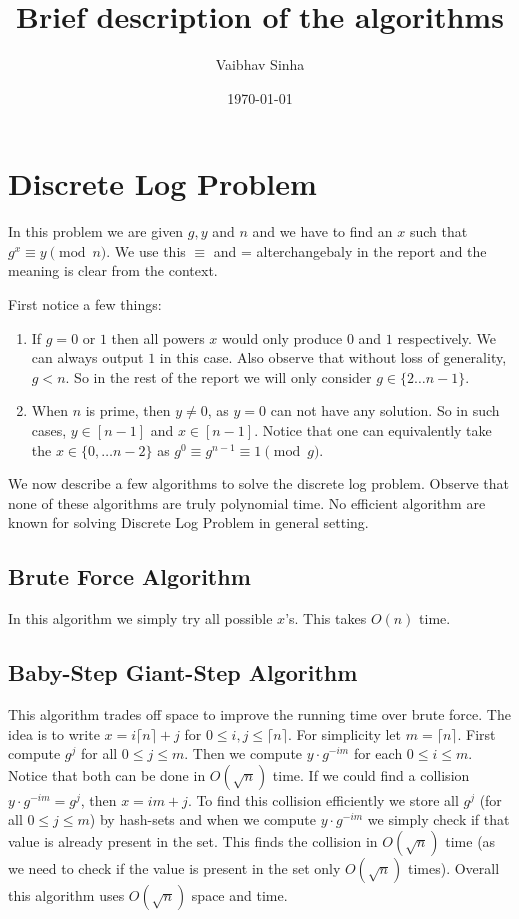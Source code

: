 \documentclass[letterpaper,12pt]{article}
\theoremstyle{remark}
\begin{document}
\title{Brief description of the algorithms}
\date{\today}
\author{Vaibhav Sinha}
\maketitle

\section{Discrete Log Problem}

In this problem we are given $g, y$ and $n$ and we have to find an $x$ such that $g^x \equiv y \pmod n$. We use this $\equiv$ and = alterchangebaly in the report and the meaning is clear from the context.

First notice a few things:
\begin{enumerate}
    \item If $g = 0$ or $1$ then all powers $x$ would only produce $0$ and $1$ respectively. We can always output $1$ in this case. Also observe that without loss of generality, $g < n$. So in the rest of the report we will only consider $g \in \{2 \dots n-1\}$. 
    \item When $n$ is prime, then $y \neq 0$, as $y = 0$ can not have any solution. So in such cases, $y \in [n-1]$ and $x \in [n-1]$. Notice that one can equivalently take the $x \in \{0, \dots n-2\}$ as $g^0 \equiv g^{n-1} \equiv 1 \pmod g$.
\end{enumerate}

We now describe a few algorithms to solve the discrete log problem. Observe that none of these algorithms are truly polynomial time. No efficient algorithm are known for solving Discrete Log Problem in general setting.

\subsection{Brute Force Algorithm}
In this algorithm we simply try all possible $x$'s. This takes $O(n)$ time.

\subsection{Baby-Step Giant-Step Algorithm}

This algorithm trades off space to improve the running time over brute force. The idea is to write $x = i\lceil n \rceil + j$ for $0 \le i,j \le \lceil n \rceil$. For simplicity let $m = \lceil n \rceil$. First compute $g^j$ for all $0 \le j \le m$. Then we compute $y\cdot g^{-im}$ for each $0 \le i \le m$. Notice that both can be done in $O(\sqrt n )$ time. If we could find a collision $y\cdot g^{-im} = g^j$, then $x = im + j$. To find this collision efficiently we store all $g^j$ (for all $0 \le j \le m$) by hash-sets and when we compute $y\cdot g^{-im}$ we simply check if that value is already present in the set. This finds the collision in $O(\sqrt{n})$ time (as we need to check if the value is present in the set only $O(\sqrt{n})$ times). Overall this algorithm uses $O(\sqrt{n})$ space and time.
\end{document}
